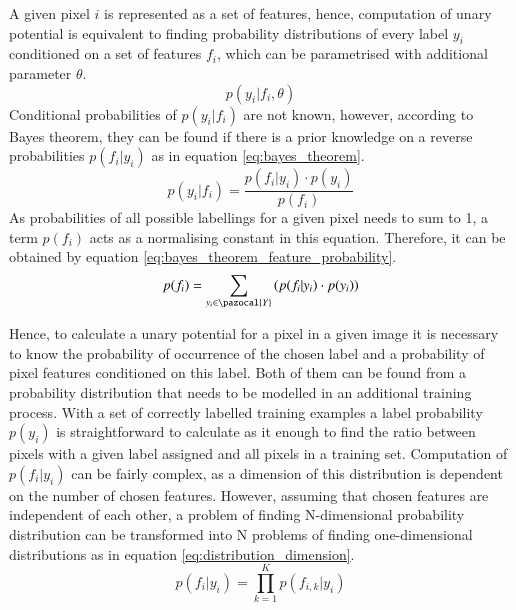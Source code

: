 A given pixel $i$ is represented as a set of features, hence, computation of unary potential is equivalent to finding probability distributions of every label $y_i$ conditioned on a set of features $f_i$, which can be parametrised with additional parameter $\theta$. 
\begin{equation}
p(y_i | f_i, \theta)
\end{equation}
Conditional probabilities of $p(y_i | f_i)$ are not known, however, according to Bayes theorem, they can be found if there is a prior knowledge on a reverse probabilities $p(f_i | y_i)$ as in equation \ref{eq:bayes_theorem}.
\begin{equation}
    \label{eq:bayes_theorem}
    p(y_i | f_i) = \frac{p(f_i | y_i) \cdot p(y_i)}{p(f_i)}
\end{equation}
As probabilities of all possible labellings for a given pixel needs to sum to 1, a term $p(f_i)$ acts as a normalising constant in this equation. Therefore, it can be obtained by equation \ref{eq:bayes_theorem_feature_probability}.
\begin{equation}
    \label{eq:bayes_theorem_feature_probability}
    p(f_i) = \sum_{y_i \in \pazocal{Y}}{(p(f_i | y_i) \cdot p(y_i))} 
\end{equation}

Hence, to calculate a unary potential for a pixel in a given image it is necessary to know the probability of occurrence of the chosen label and a probability of pixel features conditioned on this label. Both of them can be found from a probability distribution that needs to be modelled in an additional training process. With a set of correctly labelled training examples a label probability $p(y_i)$ is straightforward to calculate as it enough to find the ratio between pixels with a given label assigned and all pixels in a training set. Computation of $p(f_i | y_i)$ can be fairly complex, as a dimension of this distribution is dependent on the number of chosen features. However, assuming that chosen features are independent of each other, a problem of finding N-dimensional probability distribution can be transformed into N problems of finding one-dimensional distributions as in equation \ref{eq:distribution_dimension}.
\begin{equation}
    \label{eq:distribution_dimension}
    p(f_i|y_i) = \prod_{k=1}^{K}p(f_{i,k}|y_i)
\end{equation}

